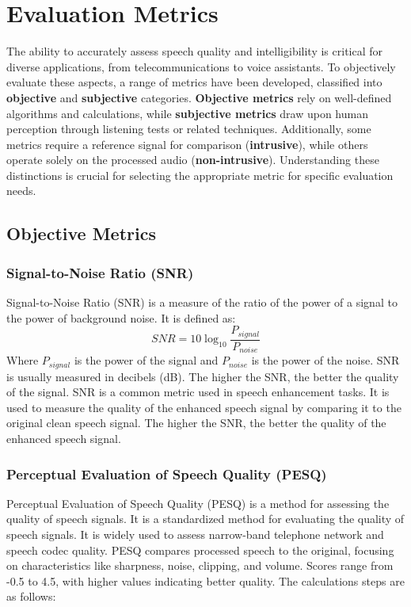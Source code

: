 \section{Evaluation Metrics}
The ability to accurately assess speech quality and intelligibility is critical for diverse applications, from telecommunications to voice assistants. To objectively evaluate these aspects, a range of metrics have been developed, classified into \textbf{objective} and \textbf{subjective} categories. \textbf{Objective metrics} rely on well-defined algorithms and calculations, while \textbf{subjective metrics} draw upon human perception through listening tests or related techniques. Additionally, some metrics require a reference signal for comparison (\textbf{intrusive}), while others operate solely on the processed audio (\textbf{non-intrusive}). Understanding these distinctions is crucial for selecting the appropriate metric for specific evaluation needs.

\subsection{Objective Metrics}
\subsubsection{Signal-to-Noise Ratio (SNR)}
Signal-to-Noise Ratio (SNR) is a measure of the ratio of the power of a signal to the power of background noise. It is defined as:
\begin{equation}
    SNR = 10 \log_{10} \frac{P_{signal}}{P_{noise}}
\end{equation}
Where $P_{signal}$ is the power of the signal and $P_{noise}$ is the power of the noise. SNR is usually measured in decibels (dB). The higher the SNR, the better the quality of the signal. SNR is a common metric used in speech enhancement tasks. It is used to measure the quality of the enhanced speech signal by comparing it to the original clean speech signal. The higher the SNR, the better the quality of the enhanced speech signal.

\subsubsection{Perceptual Evaluation of Speech Quality (PESQ)}
Perceptual Evaluation of Speech Quality (PESQ) is a method for assessing the quality of speech signals. It is a standardized method for evaluating the quality of speech signals. It is widely used to assess narrow-band telephone network and speech codec quality. PESQ compares processed speech to the original, focusing on characteristics like sharpness, noise, clipping, and volume. Scores range from -0.5 to 4.5, with higher values indicating better quality. The calculations steps are as follows:

